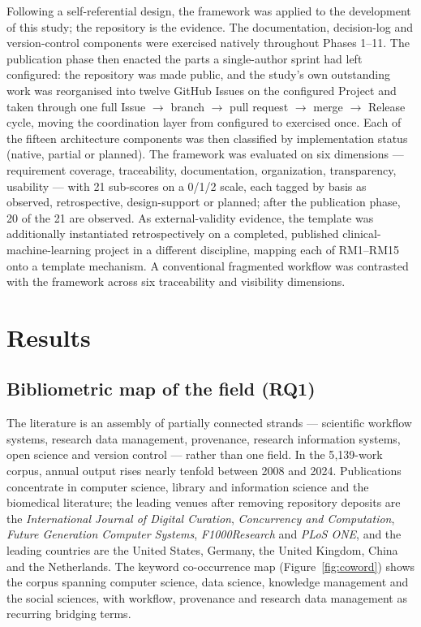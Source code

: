 \documentclass[pdflatex,sn-mathphys-num]{sn-jnl}%
\begin{document}
Following a self-referential design, the framework was applied to the development of this study; the repository is the evidence. The documentation, decision-log and version-control components were exercised natively throughout Phases 1--11. The publication phase then enacted the parts a single-author sprint had left configured: the repository was made public, and the study's own outstanding work was reorganised into twelve GitHub Issues on the configured Project and taken through one full Issue $\rightarrow$ branch $\rightarrow$ pull request $\rightarrow$ merge $\rightarrow$ Release cycle, moving the coordination layer from configured to exercised once. Each of the fifteen architecture components was then classified by implementation status (native, partial or planned). The framework was evaluated on six dimensions --- requirement coverage, traceability, documentation, organization, transparency, usability --- with 21 sub-scores on a 0/1/2 scale, each tagged by basis as observed, retrospective, design-support or planned; after the publication phase, 20 of the 21 are observed. As external-validity evidence, the template was additionally instantiated retrospectively on a completed, published clinical-machine-learning project in a different discipline, mapping each of RM1--RM15 onto a template mechanism. A conventional fragmented workflow was contrasted with the framework across six traceability and visibility dimensions.


\section{Results}\label{sec:results}

\subsection{Bibliometric map of the field (RQ1)}\label{sec:r-biblio}

The literature is an assembly of partially connected strands --- scientific workflow systems, research data management, provenance, research information systems, open science and version control --- rather than one field. In the 5{,}139-work corpus, annual output rises nearly tenfold between 2008 and 2024. Publications concentrate in computer science, library and information science and the biomedical literature; the leading venues after removing repository deposits are the \emph{International Journal of Digital Curation}, \emph{Concurrency and Computation}, \emph{Future Generation Computer Systems}, \emph{F1000Research} and \emph{PLoS ONE}, and the leading countries are the United States, Germany, the United Kingdom, China and the Netherlands. The keyword co-occurrence map (Figure~\ref{fig:coword}) shows the corpus spanning computer science, data science, knowledge management and the social sciences, with workflow, provenance and research data management as recurring bridging terms.
\end{document}
